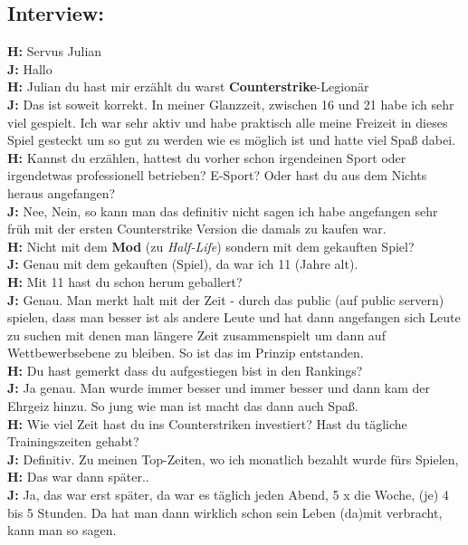 \subsection*{Interview:}
\textbf{H:} Servus Julian
\\ \textbf{J:} Hallo
\\ \textbf{H:} Julian du hast mir erzählt du warst \textbf{Counterstrike}-Legionär
\\ \textbf{J:} Das ist soweit korrekt. In meiner Glanzzeit, zwischen 16 und 21 habe ich sehr viel gespielt. Ich war sehr aktiv und habe praktisch alle meine Freizeit in dieses Spiel gesteckt um so gut zu werden wie es möglich ist und hatte viel Spaß dabei.
\\ \textbf{H:} Kannst du erzählen, hattest du vorher schon irgendeinen Sport oder irgendetwas professionell betrieben? E-Sport? Oder hast du aus dem Nichts heraus angefangen?
\\ \textbf{J:} Nee, Nein, so kann man das definitiv nicht sagen ich habe angefangen sehr früh mit der ersten Counterstrike Version die damals zu kaufen war.
\\ \textbf{H:} Nicht mit dem \textbf{Mod} (zu \textit{Half-Life}) sondern mit dem gekauften Spiel?
\\ \textbf{J:} Genau mit dem gekauften (Spiel), da war ich 11 (Jahre alt).
\\ \textbf{H:} Mit 11 hast du schon herum geballert?
\\ \textbf{J:} Genau. Man merkt halt mit der Zeit - durch das public (auf public servern) spielen, dass man besser ist als andere Leute und hat dann angefangen sich Leute zu suchen mit denen man längere Zeit zusammenspielt um dann auf Wettbewerbsebene zu bleiben. So ist das im Prinzip entstanden.
\\ \textbf{H:} Du hast gemerkt dass du aufgestiegen bist in den Rankings?
\\ \textbf{J:} Ja genau. Man wurde immer besser und immer besser und dann kam der Ehrgeiz hinzu. So jung wie man ist macht das dann auch Spaß.
\\ \textbf{H:} Wie viel Zeit hast du ins Counterstriken investiert? Hast du tägliche Trainingszeiten gehabt?
\\ \textbf{J:} Definitiv. Zu meinen Top-Zeiten, wo ich monatlich bezahlt wurde fürs Spielen,
\\ \textbf{H:} Das war dann später..
\\ \textbf{J:} Ja, das war erst später, da war es täglich jeden Abend, 5 x die Woche, (je) 4 bis 5 Stunden. Da hat man dann wirklich schon sein Leben (da)mit verbracht, kann man so sagen.
